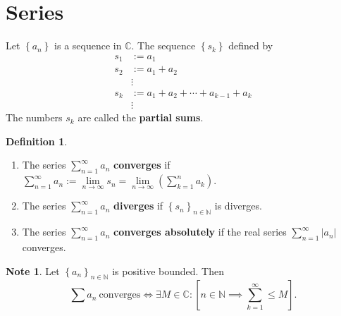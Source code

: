 \documentclass[12pt,openany]{book}
\theoremstyle{definition}
\newtheorem{definition}{Definition}[chapter]
\newtheorem*{note}{Note}
\newcommand{\set}[1]{\left\{#1\right\}}
\newcommand{\N}{\mathbb{N}}
\newcommand{\C}{\mathbb{C}}
\newcommand{\of}[1]{\left( #1 \right)}
\newcommand{\abs}[1]{\left\lvert #1 \right\rvert}
\begin{document}
	\section{Series}
	Let $\set{a_n}$ is a sequence in $\C$. The sequence $\set{s_k}$ defined by \begin{align*}
		s_1 &:= a_1 \\
		s_2 &:= a_1+a_2 \\
		&\vdots\\
		s_k&:=a_1+a_2+\cdots+a_{k-1}+a_k\\
		&\vdots
	\end{align*} The numbers $s_k$ are called the \textbf{partial sums}.
	\vspace{8pt}
	\begin{tcolorbox}[colback=white,colframe=defcolor,arc=5pt,title={\color{white}\bf Convergence of Series}]
		\begin{definition}
			\ \begin{enumerate}[(1)]
				\item The series $\sum_{n=1}^\infty a_n$ \textbf{converges} if $\sum_{n=1}^\infty a_n:=\lim\limits_{n\to\infty}s_n=\lim\limits_{n\to\infty}\of{\sum_{k=1}^na_k}$.
				\item The series $\sum_{n=1}^\infty a_n$ \textbf{diverges} if $\set{s_n}_{n\in\N}$ is diverges.
				\item The series $\sum_{n=1}^\infty a_n$ \textbf{converges absolutely} if the real series $\sum_{n=1}^\infty\abs{a_n}$ converges.
			\end{enumerate}
		\end{definition}
	\end{tcolorbox}
	\vspace{8pt}
	\begin{note}
		Let $\set{a_n}_{n\in\N}$ is positive bounded. Then \[
		\sum a_n\ \text{converges}\iff\exists M\in\C:\left[n\in\N\implies\sum_{k=1}^\infty\leq M\right].
		\]
	\end{note}
	\vspace{4pt}
\end{document}

